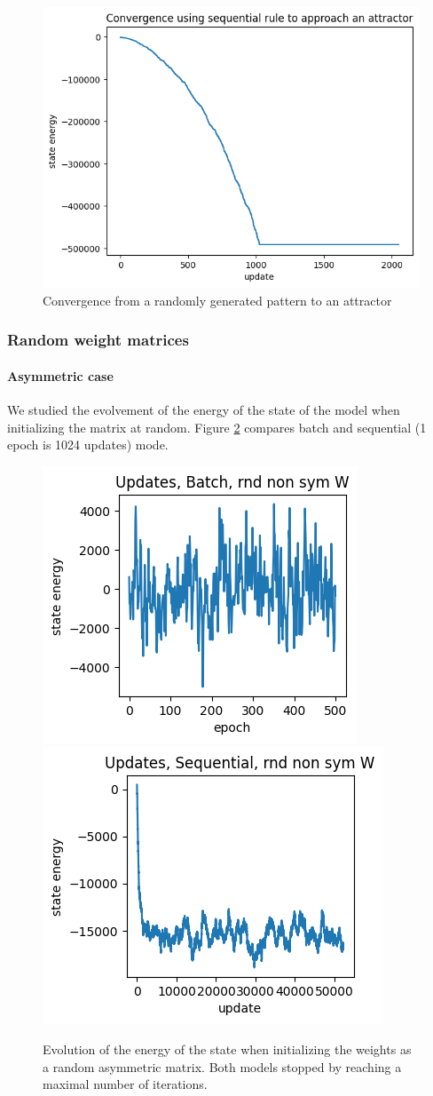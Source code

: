 \documentclass[a4paper]{article}
\begin{document}
\begin{figure}[h]
    \centering
    \includegraphics[width=.44\linewidth]{img/convergence_01.png}
    \caption{Convergence from a randomly generated pattern to an attractor}
    \label{fig:nrg_sconv_to_attr}
\end{figure}

\subsubsection{Random weight matrices}
\paragraph{Asymmetric case}
We studied the evolvement of the energy of the state of the model when initializing the matrix at random. Figure \ref{fig:nrg_rnd_weights_nsym} compares batch and sequential (1 epoch is 1024 updates) mode.

\begin{figure}[h]
    \centering
    \includegraphics[width=.33\linewidth]{img/nrg_rand_w_non_sym_batch.png}
    \includegraphics[width=.355\linewidth]{img/nrg_rand_w_non_sym_seq.png}
    \caption{Evolution of the energy of the state when initializing the weights as a random asymmetric matrix. Both models stopped by reaching a maximal number of iterations.}
    \label{fig:nrg_rnd_weights_nsym}
\end{figure}
\end{document}
